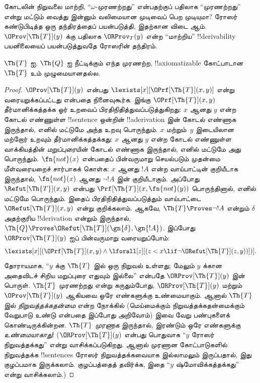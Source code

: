 \documentclass[../../../include/open-logic-section]{subfiles}
\begin{document}



கோடலின் நிறுவலை மாற்றி, “$\omega$-முரணற்றது” என்பதற்குப்
பதிலாக “முரணற்றது” என்று மட்டும் வைத்து இன்னும் வலிமையான முடிவைப்
பெற முடியுமா? ரோஸர் கண்டுபிடித்த ஒரு தந்திரத்தைப் பயன்படுத்தி,
இதற்கான விடை ஆம். $\OProv[\Th{T}](y)$ க்கு பதிலாக
$\ORProv_T(y)$ என்ற “மாற்றிய” !!{derivability} பயனிலையைப்
பயன்படுத்துவதே ரோஸரின் தந்திரம்.

\begin{thm}
  $\Th{T}$ ஐ, $\Th{Q}$ ஐ நீட்டிக்கும் எந்த முரணற்ற, !!{axiomatizable} கோட்பாடான
$\Th{T}$ உம் முழுமையானதல்ல.
\end{thm}

\begin{proof}
$\OProv[\Th{T}](y)$ என்பது
$\lexists[x][\OPrf[\Th{T}](x, y)]$ என்று வரையறுக்கப்பட்டது என்பதை
நினைவுகூர்க. இங்கு $\OPrf[\Th{T}](x, y)$ தீர்மானிக்கத்தக்க ஓர்
உறவைப் பிரதிநிதித்துவப்படுத்துகிறது: $x$ ஆனது $y$ என்ற கோடல்
எண்ணுள்ள !!{sentence} ஒன்றின் !!a{derivation} இன் கோடல் எண்ணாக
இருந்தால், எனில் மட்டுமே அந்த உறவு பொருந்தும். $x$ மற்றும்~$y$
இடையிலான மற்றோர் உறவும் தீர்மானிக்கத்தக்கது: $x$ ஆனது $y$ என்ற
கோடல் எண்ணுள்ள வாக்கியத்தின் \emph{மறுப்புரை}யின் கோடல் எண்ணாக
இருந்தால், எனில் மட்டுமே அது பொருந்தும். $\fn{not}(x)$ என்பதைப்
பின்வருமாறு செயல்படும் முதன்மை மீள்வரையறைச் சார்பாகக் கொள்க:
$x$ ஆனது $!A$ என்ற வாய்பாட்டின் குறியீடாக இருந்தால்,
$\fn{not}(x)$ ஆனது $\lnot !A$ இன் குறியீடாகும். அப்போது
$\Refut[\Th{T}](x, y)$ என்பது
$\Prf[\Th{T}](x, \fn{not}(y))$ பொருந்தினால், எனில் மட்டுமே
பொருந்தும். இதைப் பிரதிநிதித்துவப்படுத்தும் வாய்பாட்டை
$\ORefut[\Th{T}](x, y)$ என்று குறிக்கலாம். ஆகவே,
$\Th{T} \Proves \lnot !A$ என்றும் $\delta$ அதற்குரிய
!!{derivation} என்றும் இருந்தால்,
$\Th{Q} \Proves \ORefut[\Th{T}](\gn{\delta}, \gn{!A})$.
இப்போது $\ORProv[\Th{T}](y)$ ஐப் பின்வருமாறு வரையறுப்போம்:
\[
\lexists[x][(\OPrf[\Th{T}](x,y) \land \lforall[z][(z < x \lif \lnot
  \ORefut[\Th{T}](z,y))])].
\]
தோராயமாக,
“$y$ க்கு $\Th{T}$ இல் ஒரு நிறுவல் உள்ளது; மேலும் $y$ க்கான அதைவிடச்
சிறிய மறுப்புரை எதுவும் இல்லை” என்பதே
$\ORProv[\Th{T}](y)$ இன் பொருள். $\Th{T}$ முரணற்றது என்று
கருதும்போது, $\ORProv[\Th{T}](y)$ மற்றும்
$\OProv[\Th{T}](y)$ ஆகியவை ஒரே எண்களுக்கு உண்மையாகும். ஆனால்
$\Th{T}$ இல் \emph{நிறுவத்தக்கதன்மை} என்ற நோக்கில் (மெய்மைக்கும்
நிறுவத்தக்கதன்மைக்கும் வேறுபாடு உண்டு என்பதை இப்போது அறிவோம்) இவை
  வேறு பண்புகளைக் கொண்டிருக்கின்றன. $\Th{T}$ \emph{முரணாக} இருந்தால், இரண்டும்
ஒரே எண்களுக்கு \emph{உண்மையாகாது}!{} ($\ORProv[\Th{T}](y)$ என்பது
  பொதுவாக “$y$ ரோஸர் நிறுவத்தக்கது” என்று வாசிக்கப்படுகிறது. ஆனால்
  முரணான கோட்பாடுகளில் நிறுவத்தக்க !!{sentence}s ரோஸர்
நிறுவத்தக்கவையாக இல்லாமலும் இருப்பதால், இது குழப்பமாக இருக்கலாம்.
  குழப்பத்தைத் தவிர்க்க, இதை “$y$ ஷ்மோவிக்கத்தக்கது” என்று வாசிக்கலாம்.)


\end{proof}
\end{document}
